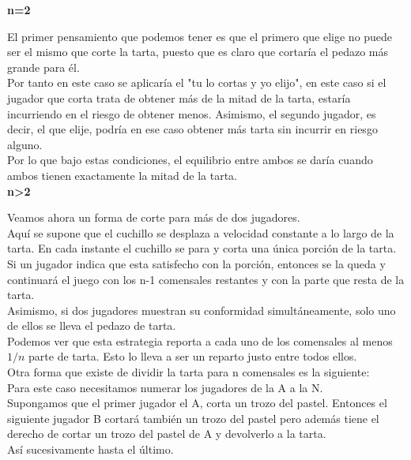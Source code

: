 \documentclass[10pt,a4paper]{book}
\begin{document}
\textbf{n=2}

El primer pensamiento que podemos tener es que el primero que elige no puede ser el mismo que corte la tarta, puesto que es claro que cortaría el pedazo más grande para él.\\

Por tanto en este caso se aplicaría el "tu lo cortas y yo elijo", en este caso si el jugador que corta trata de obtener más de la mitad de la tarta, estaría incurriendo en el riesgo de obtener menos. Asimismo, el segundo jugador, es decir, el que elije, podría en ese caso obtener más tarta sin incurrir en riesgo alguno.\\

Por lo que bajo estas condiciones, el equilibrio entre ambos se daría cuando ambos tienen exactamente la mitad de la tarta.\\


\textbf{n>2}

Veamos ahora un forma de corte para más de dos jugadores.\\

Aquí se supone que el cuchillo se desplaza a velocidad constante a lo largo de la tarta. En cada instante el cuchillo se para y corta una única porción de la tarta.\\

Si un jugador indica que esta satisfecho con la porción, entonces se la queda y continuará el juego con los n-1 comensales restantes y con la parte que resta de la tarta.\\

Asimismo, si dos jugadores muestran su conformidad simultáneamente, solo uno de ellos se lleva el pedazo de tarta.\\


Podemos ver que esta estrategia reporta a cada uno de los comensales al menos $1/n$ parte de tarta. Esto lo lleva a ser un reparto justo entre todos ellos.\\


Otra forma que existe de dividir la tarta para n comensales es la siguiente:\\

Para este caso necesitamos numerar los jugadores de la A a la N.\\

Supongamos que el primer jugador el A, corta un trozo del pastel. Entonces el siguiente jugador B cortará también un trozo del pastel pero además tiene el derecho de cortar un trozo del pastel de A y devolverlo a la tarta.\\ 
Así sucesivamente hasta el último.\\
\end{document}
